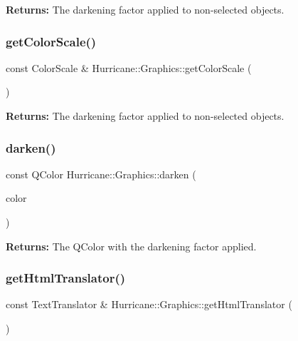 {\bfseries Returns\+:} The darkening factor applied to non-\/selected objects. \mbox{\label{classHurricane_1_1Graphics_a8735a458885beb3b74ad5fb77db82797}} 
\subsubsection{\texorpdfstring{get\+Color\+Scale()}{getColorScale()}}
{\footnotesize\ttfamily const Color\+Scale \& Hurricane\+::\+Graphics\+::get\+Color\+Scale (\begin{DoxyParamCaption}\item[{Color\+Scale\+::\+Scale\+Type}]{ }\end{DoxyParamCaption})\hspace{0.3cm}{\ttfamily [static]}}

{\bfseries Returns\+:} The darkening factor applied to non-\/selected objects. \mbox{\label{classHurricane_1_1Graphics_ab4c69a277249850a397a4c5fce31f965}} 
\subsubsection{\texorpdfstring{darken()}{darken()}}
{\footnotesize\ttfamily const Q\+Color Hurricane\+::\+Graphics\+::darken (\begin{DoxyParamCaption}\item[{const Q\+Color \&}]{color }\end{DoxyParamCaption})\hspace{0.3cm}{\ttfamily [static]}}

{\bfseries Returns\+:} The Q\+Color with the darkening factor applied. \mbox{\label{classHurricane_1_1Graphics_a2f5e702ff1ea293edc5a89aaae1facf2}} 
\subsubsection{\texorpdfstring{get\+Html\+Translator()}{getHtmlTranslator()}}
{\footnotesize\ttfamily const Text\+Translator \& Hurricane\+::\+Graphics\+::get\+Html\+Translator (\begin{DoxyParamCaption}{ }\end{DoxyParamCaption})\hspace{0.3cm}{\ttfamily [static]}}

